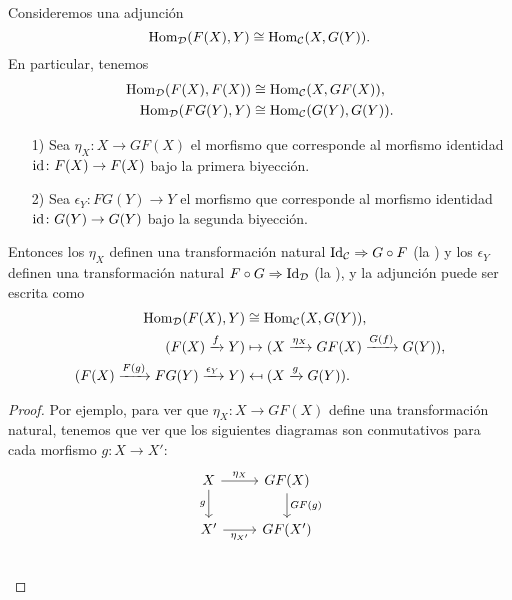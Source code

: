 \documentclass{article}
\numberwithin{equation}{section}
\theoremstyle{definition}
\begin{document}
\begin{proposicion}
  \label{unidad-y-counidad}
  Consideremos una adjunción
  $$\operatorname{Hom}_\mathcal{D} (F (X), Y) \cong \operatorname{Hom}_\mathcal{C} (X, G (Y)).$$
  En particular, tenemos
  \begin{align*}
    \operatorname{Hom}_\mathcal{D} (F (X), F(X)) & \cong \operatorname{Hom}_\mathcal{C} (X, GF (X)),\\
    \operatorname{Hom}_\mathcal{D} (FG (Y), Y) & \cong \operatorname{Hom}_\mathcal{C} (G (Y), G (Y)).
  \end{align*}

  \begin{enumerate}
  \item[1)] Sea $\eta_X\colon X\to GF (X)$ el morfismo que corresponde al
    morfismo identidad $\mathrm{id}\colon F(X) \to F(X)$ bajo la primera biyección.

  \item[2)] Sea $\epsilon_Y\colon FG (Y) \to Y$ el morfismo que corresponde al
    morfismo identidad $\mathrm{id}\colon G (Y) \to G (Y)$ bajo la segunda biyección.
  \end{enumerate}

  Entonces los $\eta_X$ definen una transformación natural
  $\operatorname{Id}_\mathcal{C} \Rightarrow G\circ F$ (la ) y los
  $\epsilon_Y$ definen una transformación natural
  $F\circ G\Rightarrow \operatorname{Id}_\mathcal{D}$ (la ), y
  la adjunción puede ser escrita como
  \begin{align*}
    \operatorname{Hom}_\mathcal{D} (F (X), Y) & \cong \operatorname{Hom}_\mathcal{C} (X, G (Y)),\\
    (F (X) \xrightarrow{f} Y) & \mapsto (X\xrightarrow{\eta_X} GF (X) \xrightarrow{G (f)} G (Y)),\\
    (F (X)\xrightarrow{F (g)} FG (Y) \xrightarrow{\epsilon_Y} Y) & \mapsfrom (X\xrightarrow{g} G (Y)).
  \end{align*}

  \begin{proof}
    Por ejemplo, para ver que $\eta_X\colon X\to GF (X)$ define una
    transformación natural, tenemos que ver que los siguientes diagramas son
    conmutativos para cada morfismo $g\colon X\to X'$:
    \[ \begin{tikzcd}
        X\ar{r}{\eta_X}\ar{d}[swap]{g} & GF (X)\ar{d}{GF (g)} \\
        X'\ar{r}[swap]{\eta_{X'}} & GF (X') \\
      \end{tikzcd} \]


\end{proof}
\end{proposicion}
\end{document}
